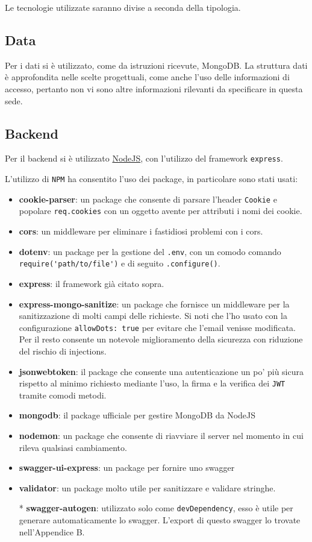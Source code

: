 Le tecnologie utilizzate saranno divise a seconda della tipologia.
\subsection{Data}
Per i dati si è utilizzato, come da istruzioni ricevute, MongoDB. La struttura dati è approfondita nelle scelte progettuali, come anche l'uso delle informazioni di accesso, pertanto non vi sono altre informazioni rilevanti da specificare in questa sede.
\subsection{Backend}
Per il backend si è utilizzato \href{https://nodejs.org/en/about}{NodeJS}, con l'utilizzo del framework \verb|express|\cite{express}.

L'utilizzo di \verb|NPM| ha consentito l'uso dei package, in particolare sono stati usati:
\begin{itemize}
    \item \textbf{cookie-parser}: un package che consente di parsare l'header \verb|Cookie| e popolare \verb|req.cookies| con un oggetto avente per attributi i nomi dei cookie\cite{cookie-parser}.
    \item \textbf{cors}: un middleware per eliminare i fastidiosi problemi con i cors\cite{cors}.
    \item \textbf{dotenv}: un package per la gestione del \verb|.env|, con un comodo comando \verb|require('path/to/file')| e di seguito \verb|.configure()|\cite{dotenv}.
    \item \textbf{express}: il framework già citato sopra.
    \item \textbf{express-mongo-sanitize}: un package che fornisce un middleware per la sanitizzazione di molti campi delle richieste. Si noti che l'ho usato con la configurazione \verb|allowDots: true| per evitare che l'email venisse modificata. Per il resto consente un notevole miglioramento della sicurezza con riduzione del rischio di injections\cite{express-mongo-sanitize}.
    \item \textbf{jsonwebtoken}: il package che consente una autenticazione un po' più sicura rispetto al minimo richiesto mediante l'uso, la firma e la verifica dei \verb|JWT| tramite comodi metodi\cite{jsonwebtoken}.
    \item \textbf{mongodb}: il package ufficiale per gestire MongoDB da NodeJS\cite{mongodb-npm}
    \item \textbf{nodemon}: un package che consente di riavviare il server nel momento in cui rileva qualsiasi cambiamento\cite{nodemon}.
    \item \textbf{swagger-ui-express}: un package per fornire uno swagger\cite{swagger-ui-express}
    \item \textbf{validator}: un package molto utile per sanitizzare e validare stringhe\cite{validator}.
    \item[*] \textbf{swagger-autogen}: utilizzato solo come \verb|devDependency|, esso è utile per generare automaticamente lo swagger\cite{swagger-autogen}. L'export di questo swagger lo trovate nell'Appendice B.
\end{itemize}
